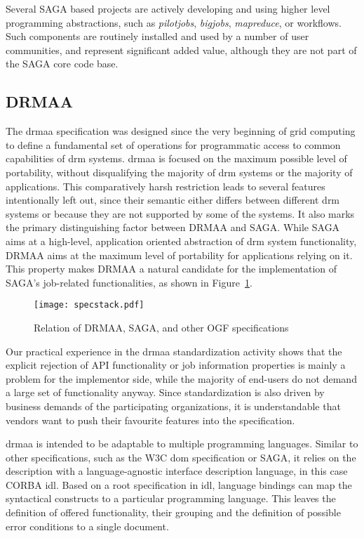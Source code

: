 \documentclass[twocolumn]{svjour3}       %
\begin{document}
Several SAGA based projects are actively developing and using higher level programming abstractions, such as \emph{pilotjobs}, \emph{bigjobs}, \emph{mapreduce}, or workflows.  Such components are routinely installed and used by a number of user communities, and represent significant added value, although they are not part of the SAGA core code base. 

\subsection{DRMAA}
\label{sec:drmaa}

The \gls{drmaa} specification was designed since the very beginning of grid computing to define a fundamental set of operations for programmatic access to common capabilities of \gls{drm} systems. \gls{drmaa} is focused on the maximum possible level of portability, without disqualifying the majority of \gls{drm} systems or the majority of applications. This comparatively harsh restriction leads to several features intentionally left out, since their semantic either differs between different \gls{drm} systems or because they are not supported by some of the systems. It also marks the primary distinguishing factor between DRMAA and SAGA. While SAGA aims at a high-level, application oriented abstraction of \gls{drm} system functionality, DRMAA aims at the maximum level of portability for applications relying on it. This property makes DRMAA a natural candidate for the implementation of SAGA's job-related functionalities, as shown in Figure~\ref{fig:specstack}. 

\begin{figure}
  \texttt{[image: specstack.pdf]}
\caption{Relation of DRMAA, SAGA, and other OGF specifications}
\label{fig:specstack} 
\end{figure}


Our practical experience in the \gls{drmaa} standardization activity shows that the explicit rejection of API functionality or job information properties is mainly a problem for the implementor side, while the majority of end-users do not demand a large set of functionality anyway. Since standardization is also driven by business demands of the participating organizations, it is understandable that vendors want to push their favourite features into the specification.

\gls{drmaa} is intended to be adaptable to multiple programming languages. Similar to other specifications, such as the W3C \gls{dom} specification or SAGA, it relies on the description with a language-agnostic interface description language, in this case CORBA \gls{idl}. Based on a root specification in \gls{idl}, language bindings can map the syntactical constructs to a particular programming language. This leaves the definition of offered functionality, their grouping and the definition of possible error conditions to a single document.
\end{document}
